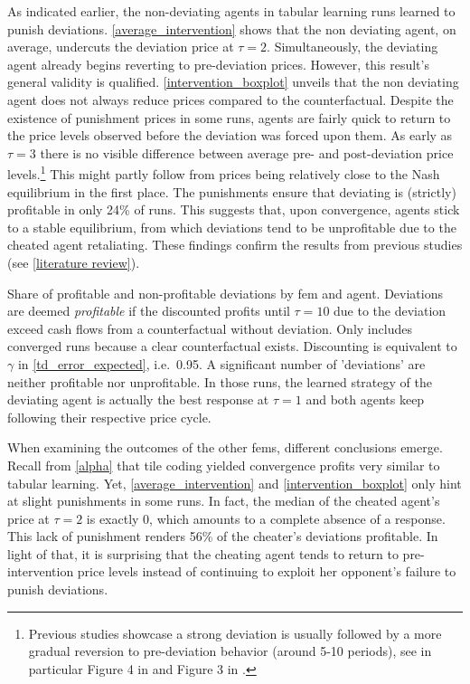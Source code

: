 As indicated earlier, the non-deviating agents in tabular learning runs learned to punish deviations. \autoref{average_intervention} shows that the non deviating agent, on average, undercuts the deviation price at $\tau = 2$.  Simultaneously, the deviating agent already begins reverting to pre-deviation prices. However, this result's general validity is qualified. \autoref{intervention_boxplot} unveils that the non deviating agent does not always reduce prices compared to the counterfactual. Despite the existence of punishment prices in some runs, agents are fairly quick to return to the price levels observed before the deviation was forced upon them. As early as $\tau = 3$ there is no visible difference between average pre- and post-deviation price levels.\footnote{Previous studies showcase a strong deviation is usually followed by a more gradual reversion to pre-deviation behavior (around 5-10 periods), see in particular Figure 4 in \textcite{calvano_artificial_2020} and Figure 3 in \textcite{klein_autonomous_2019}.} This might partly follow from prices being relatively close to the Nash equilibrium in the first place. The punishments ensure that deviating is (strictly) profitable in only 24\% of runs. This suggests that, upon convergence, agents stick to a stable equilibrium, from which deviations tend to be unprofitable due to the cheated agent retaliating. These findings confirm the results from previous studies (see \autoref{literature review}).


	\begin{table}
		\centering
		
		\caption[Share of profitable deviations by \gls{fem} and agent]{Share of profitable and non-profitable deviations by \gls{fem} and agent. Deviations are deemed \emph{profitable} if the discounted profits until $\tau = 10$ due to the deviation exceed cash flows from a counterfactual without deviation. Only includes converged runs because a clear counterfactual exists. Discounting is equivalent to $\gamma$ in \autoref{td_error_expected}, i.e.\ 0.95. A significant number of 'deviations' are neither profitable nor unprofitable. In those runs, the learned strategy of the deviating agent is actually the best response at $\tau = 1$ and both agents keep following their respective price cycle.}
		\label{share_deviation_profitability}
	\end{table}

When examining the outcomes of the other \gls{fem}s, different conclusions emerge. Recall from \autoref{alpha} that tile coding yielded convergence profits very similar to tabular learning. Yet, \autoref{average_intervention} and \autoref{intervention_boxplot} only hint at slight punishments in some runs. In fact, the median of the cheated agent's price at $\tau = 2$ is exactly 0, which amounts to a complete absence of a response. This lack of punishment renders 56\% of the cheater's deviations profitable. In light of that, it is surprising that the cheating agent tends to return to pre-intervention price levels instead of continuing to exploit her opponent's failure to punish deviations.

